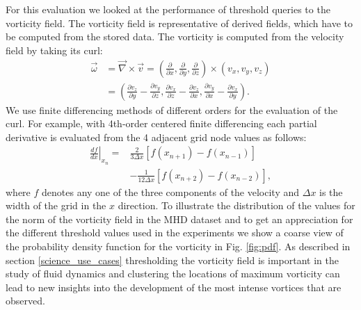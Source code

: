\documentclass{sig-alternate}
\newcommand{\kk}[1]{{\color{blue}{\it KK: #1}}}
\begin{document}
For this evaluation we looked at the performance of threshold queries to the vorticity field. The vorticity field is representative of derived fields, which
have to be computed from the stored data. The vorticity is computed from the velocity field by taking its curl:
\begin{align}
\vec{\omega} &= \vec{\nabla} \times \vec{v} = \left( \frac{\partial}{\partial x}, \frac{\partial}{\partial y}, \frac{\partial}{\partial z} \right) 
\times \nonumber \left( v_x, v_y, v_z \right)\\
&= \left( \frac{\partial v_z}{\partial y} - \frac{\partial v_y}{\partial z}, \frac{\partial v_x}{\partial z} - \frac{\partial v_z}{\partial x}, 
\frac{\partial v_y}{\partial x} - \frac{\partial v_x}{\partial y} \right).
\label{eq:curl}
\end{align}
We use finite differencing methods of
different orders for the evaluation of the curl. For example, with 4th-order centered finite differencing each partial derivative is evaluated from the 4
adjacent grid node values as follows:  
\begin{align} 
\left.\frac{df}{dx}\right|_{x_n} = &\frac{2}{3\Delta x}[f(x_{n+1})-f(x_{n-1})]\nonumber\\ 
&-\frac{1}{12\Delta x}[f(x_{n+2})-f(x_{n-2})],
\end{align}
where $f$ denotes any one of the three components of the velocity and $\Delta x$ is the width of the grid in the $x$ direction.
To illustrate the distribution of the values for the norm of the vorticity field in the MHD dataset and to get an appreciation for the different threshold values
used in the experiments we show a coarse view of the probability density function for the vorticity in Fig. \ref{fig:pdf}.  
As described in section \ref{science_use_cases}
thresholding the vorticity field is important in the study of fluid dynamics and clustering the locations of maximum vorticity can lead to new insights into
the development of the most intense vortices that are observed. 
\end{document}
